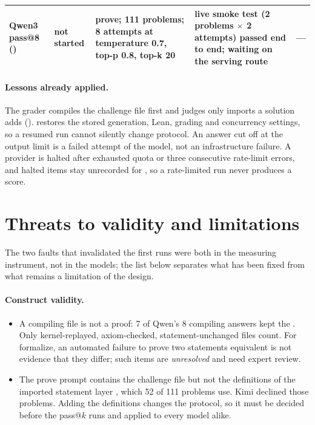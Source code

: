 \documentclass[11pt,a4paper]{article}
\begin{document}
\begin{table}[htbp]
\begin{tabular}{L{26mm}L{14mm}L{32mm}L{38mm}L{36mm}}
Qwen3 pass@8 () & not started & prove; 111 problems; 8 attempts at temperature 0.7, top-p 0.8, top-k 20 & live smoke test (2 problems $\times$ 2 attempts) passed end to end; waiting on the serving route & --- \\
\bottomrule
\end{tabular}
\end{table}

\paragraph{Lessons already applied.} The grader compiles the challenge file first and judges only imports a solution adds ().  restores the stored generation, Lean, grading and concurrency settings, so a resumed run cannot silently change protocol. An answer cut off at the output limit is a failed attempt of the model, not an infrastructure failure. A provider is halted after exhausted quota or three consecutive rate-limit errors, and halted items stay unrecorded for , so a rate-limited run never produces a score.

\section{Threats to validity and limitations}
\label{sec:threats}

The two faults that invalidated the first runs were both in the measuring instrument, not in the models; the list below separates what has been fixed from what remains a limitation of the design.

\paragraph{Construct validity.}
\begin{itemize}
\item A compiling file is not a proof: 7 of Qwen's 8 compiling answers kept the . Only kernel-replayed, axiom-checked, statement-unchanged files count. For formalize, an automated failure to prove two statements equivalent is not evidence that they differ; such items are \emph{unresolved} and need expert review.
\item The prove prompt contains the challenge file but not the definitions of the imported statement layer , which 52 of 111 problems use. Kimi declined those problems. Adding the definitions changes the protocol, so it must be decided before the pass@$k$ runs and applied to every model alike.
\end{itemize}
\end{document}
